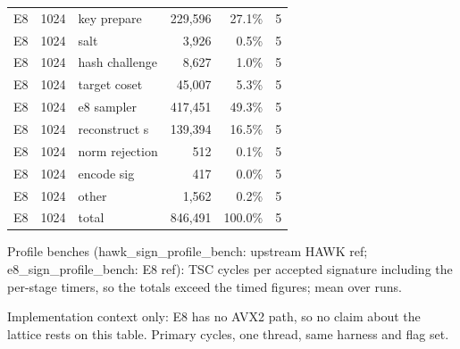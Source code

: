 \begin{table}[t]
{\begin{tabular}{lrlrrr}
E8 & 1024 & key prepare & 229{,}596 & 27.1\% & 5 \\
E8 & 1024 & salt & 3{,}926 & 0.5\% & 5 \\
E8 & 1024 & hash challenge & 8{,}627 & 1.0\% & 5 \\
E8 & 1024 & target coset & 45{,}007 & 5.3\% & 5 \\
E8 & 1024 & e8 sampler & 417{,}451 & 49.3\% & 5 \\
E8 & 1024 & reconstruct s & 139{,}394 & 16.5\% & 5 \\
E8 & 1024 & norm rejection & 512 & 0.1\% & 5 \\
E8 & 1024 & encode sig & 417 & 0.0\% & 5 \\
E8 & 1024 & other & 1{,}562 & 0.2\% & 5 \\
E8 & 1024 & total & 846{,}491 & 100.0\% & 5 \\
\bottomrule
\end{tabular}}
\par\smallskip\parbox{\linewidth}{\scriptsize Profile benches (hawk\_sign\_profile\_bench: upstream HAWK ref; e8\_sign\_profile\_bench: E8 ref): TSC cycles per accepted signature including the per-stage timers, so the totals exceed the timed figures; mean over runs.}
\end{table}

\begin{table}[t]
\centering\footnotesize
\caption{Context: HAWK AVX2 (upstream Optimized\_Implementation; not a fair pair) (flags O3native, run set headline)}
\label{tab:cmp7-o3native}
\par\smallskip\parbox{\linewidth}{\scriptsize Implementation context only: E8 has no AVX2 path, so no claim about the lattice rests on this table. Primary cycles, one thread, same harness and flag set.}
\end{table}

